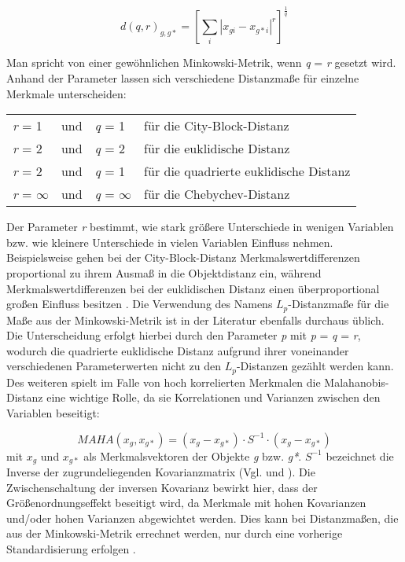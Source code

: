 \begin{equation}
d(q,r)_{g,g*} = 
\left[	\sum_{i} |x_{gi} - x_{g*i}|^r	\right]^\frac{1}{q}
\end{equation}

Man spricht von einer gewöhnlichen Minkowski-Metrik, wenn \textit{q} = \textit{r} gesetzt wird. Anhand der Parameter lassen sich verschiedene Distanzmaße für einzelne Merkmale unterscheiden:
\begin{center}
\begin{tabular}{lcll}
	\textit{r} = 1 & und & \textit{q} = 1 & für die City-Block-Distanz \\
	\textit{r} = 2 & und & \textit{q} = 2 & für die euklidische Distanz \\
	\textit{r} = 2 & und & \textit{q} = 1 & für die quadrierte euklidische Distanz \\
	\textit{r} = $\infty$ & und & \textit{q} = $\infty$ & für die Chebychev-Distanz \\
\end{tabular}
\end{center}

Der Parameter \textit{r} bestimmt, wie stark größere Unterschiede in wenigen Variablen bzw. wie kleinere Unterschiede in vielen Variablen Einfluss nehmen. Beispielsweise gehen bei der City-Block-Distanz Merkmalswertdifferenzen proportional zu ihrem Ausmaß in die Objektdistanz ein, während Merkmalswertdifferenzen bei der euklidischen Distanz einen überproportional großen Einfluss besitzen \citep[Vgl.][S. 212]{Eckey.2002}. Die Verwendung des Namens $L_p$-Distanzmaße für die Maße aus der Minkowski-Metrik ist in der Literatur ebenfalls durchaus üblich. Die Unterscheidung erfolgt hierbei durch den Parameter \textit{p} mit \textit{p} = \textit{q} = \textit{r}, wodurch die quadrierte euklidische Distanz aufgrund ihrer voneinander verschiedenen Parameterwerten nicht zu den $L_p$-Distanzen gezählt werden kann. \\

Des weiteren spielt im Falle von hoch korrelierten Merkmalen die Malahanobis-Distanz eine wichtige Rolle, da sie Korrelationen und Varianzen zwischen den Variablen beseitigt:

\begin{equation}
MAHA(x_{g},x_{g*}) = (x_{g} - x_{g*}) \cdot S^{-1} \cdot (x_{g} - x_{g*})
\end{equation}
mit $x_{g}$ und $x_{g*}$ als Merkmalsvektoren der Objekte \textit{g} bzw. \textit{g*}. $S^{-1}$ bezeichnet die Inverse der zugrundeliegenden Kovarianzmatrix (Vgl. \citealt[S. 339]{Bacher.2010} und \citealt[S. 168]{Bankhofer.2008}). Die Zwischenschaltung der inversen Kovarianz bewirkt hier, dass der Größenordnungseffekt beseitigt wird, da Merkmale mit hohen Kovarianzen und/oder hohen Varianzen abgewichtet werden. Dies kann bei Distanzmaßen, die aus der Minkowski-Metrik errechnet werden, nur durch eine vorherige Standardisierung erfolgen \citep[Vgl.][S. 214]{Eckey.2002}.
